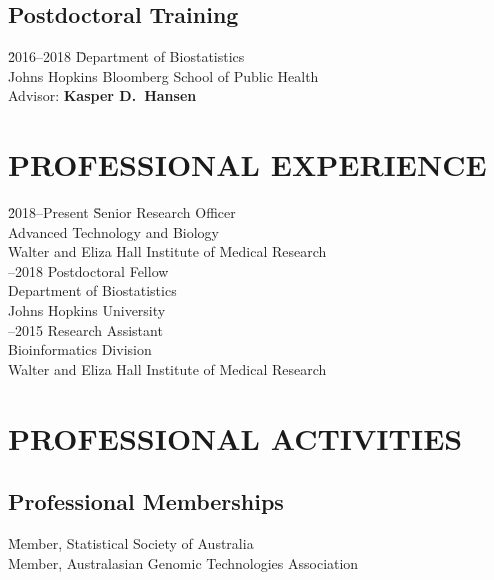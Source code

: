 \documentclass[11pt,letterpaper,pdf]{article}
\begin{document}
\subsection*{Postdoctoral Training}

\begin{tabbing}
  \= 2016--2018 \hspace*{0.55cm} \= Department of Biostatistics \\
  \>\> Johns Hopkins Bloomberg School of Public Health\\
  \>\> Advisor: {\bf Kasper D.\ Hansen}
\end{tabbing}

\section*{PROFESSIONAL EXPERIENCE}

\begin{tabbing}
  \= 2018--Present \hspace*{0.1cm} \= Senior Research Officer\\
  \>\>Advanced Technology and Biology\\
  \>\>Walter and Eliza Hall Institute of Medical Research\\
  --2018 \> Postdoctoral Fellow\\
  \>\>Department of Biostatistics\\
  \>\> Johns Hopkins University \\
  --2015 \> Research Assistant\\
  \>\>Bioinformatics Division\\
  \>\> Walter and Eliza Hall Institute of Medical Research
\end{tabbing}

\section*{PROFESSIONAL ACTIVITIES}

\subsection*{Professional Memberships}

\begin{tabbing}
  \= Member, Statistical Society of Australia\\
  \> Member, Australasian Genomic Technologies Association\\
\end{tabbing}
\end{document}
